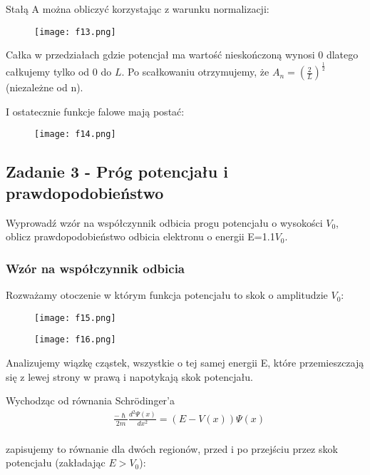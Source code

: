 \documentclass[a4paper,15pt]{article}
\newcommand{\issue}[2]{
    \begin{tcolorbox}[colback=issueColor!5!white,colframe=issueColor,title={Zagadnienie #1}]
        #2
    \end{tcolorbox}
}
\begin{document}
Stałą A można obliczyć korzystając z warunku normalizacji:

\begin{figure}[H]
\centerline{\texttt{[image: f13.png]}}
\end{figure}

Całka w przedziałach gdzie potencjał ma wartość nieskończoną wynosi 0 dlatego całkujemy tylko od $0$ do $L$. Po scałkowaniu otrzymujemy, że $A_n = (\frac{2}{L})^\frac{1}{2}$ (niezależne od n). 

I ostatecznie funkcje falowe mają postać:
\begin{figure}[H]
\centerline{\texttt{[image: f14.png]}}
\end{figure}


\newpage
\subsection{Zadanie 3 - Próg potencjału i prawdopodobieństwo}


\issue{}{
Wyprowadź wzór na współczynnik odbicia progu potencjału o wysokości $V_0$, oblicz prawdopodobieństwo odbicia elektronu o energii E=1.1$V_0$.
}

\subsubsection{Wzór na współczynnik odbicia}

Rozważamy otoczenie w którym funkcja potencjału to skok o amplitudzie $V_0$:

\begin{figure}[H]
\centerline{\texttt{[image: f15.png]}}
\end{figure}

\begin{figure}[H]
\centerline{\texttt{[image: f16.png]}}
\end{figure}

Analizujemy wiązkę cząstek, wszystkie o tej samej energii E, które przemieszczają się z lewej strony w prawą i napotykają skok potencjału. 


Wychodząc od równania Schrödinger'a 
\begin{align*}
& \frac{-\hslash}{2m}\frac{d^2\Psi (x)}{dx^2} = (E-V(x))\Psi (x) \\
\end{align*}

zapisujemy to równanie dla dwóch regionów, przed i po przejściu przez skok potencjału (zakładając $E > V_0$):
\end{document}
